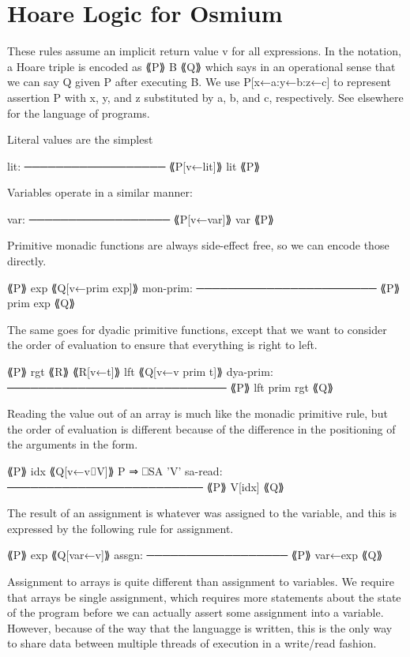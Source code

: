 \section{Hoare Logic for Osmium}

These rules assume an implicit return value v for all expressions.
In the notation, a Hoare triple is encoded as ⟪P⟫ B ⟪Q⟫ which says 
in an operational sense that we can say Q given P after executing B.
We use P[x←a:y←b:z←c] to represent assertion P with x, y, and z 
substituted by a, b, and c, respectively. See elsewhere for the 
language of programs.

Literal values are the simplest

lit: ──────────────────
     ⟪P[v←lit]⟫ lit ⟪P⟫

Variables operate in a similar manner:

var: ──────────────────
     ⟪P[v←var]⟫ var ⟪P⟫

Primitive monadic functions are always side-effect free, so we can 
encode those directly.

          ⟪P⟫ exp ⟪Q[v←prim exp]⟫
mon-prim: ───────────────────────
          ⟪P⟫ prim exp ⟪Q⟫

The same goes for dyadic primitive functions, except that we want 
to consider the order of evaluation to ensure that everything is 
right to left.

          ⟪P⟫ rgt ⟪R⟫
          ⟪R[v←t]⟫ lft ⟪Q[v←v prim t]⟫
dya-prim: ────────────────────────────
          ⟪P⟫ lft prim rgt ⟪Q⟫
          
Reading the value out of an array is much like the monadic 
primitive rule, but the order of evaluation is different because 
of the difference in the positioning of the arguments in the form.

         ⟪P⟫ idx ⟪Q[v←v⌷V]⟫
         P ⇒ ⎕SA 'V'
sa-read: ─────────────────────────
         ⟪P⟫ V[idx] ⟪Q⟫

The result of an assignment is whatever was assigned to the variable, 
and this is expressed by the following rule for assignment.

       ⟪P⟫ exp ⟪Q[var←v]⟫
assgn: ──────────────────
       ⟪P⟫ var←exp ⟪Q⟫

Assignment to arrays is quite different than assignment to variables.
We require that arrays be single assignment, which requires more 
statements about the state of the program before we can actually 
assert some assignment into a variable. However, because of the 
way that the languagge is written, this is the only way to share 
data between multiple threads of execution in a write/read fashion.

